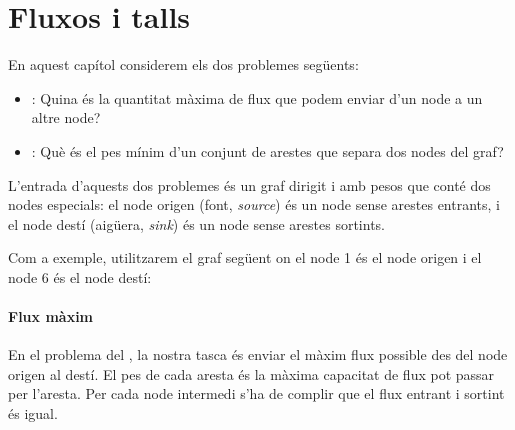 \chapter{Fluxos i talls}

En aquest capítol considerem els dos problemes següents:

\begin{itemize}
\item {}: Quina és la quantitat màxima de
  flux que podem enviar d'un node a un altre node?
\item {}: Què és el pes mínim d'un conjunt de arestes
  que separa dos nodes del graf?
\end{itemize}


L'entrada d'aquests dos problemes és un graf dirigit i amb pesos que
conté dos nodes especials: el node origen (font, \emph{source}) és un
node sense arestes entrants, i el node destí (aigüera,
\emph{sink}) és un node sense arestes sortints.

Com a exemple, utilitzarem el graf següent on el node 1 és el node origen i
el node 6 és el node destí:


\begin{center}
\end{center}


\subsubsection{Flux màxim}

 

En el problema del , la nostra tasca és enviar el
màxim flux possible des del node origen al destí. El pes de cada
aresta és la màxima capacitat de flux pot passar per l'aresta. Per
cada node intermedi s'ha de complir que el flux entrant i sortint és
igual.

